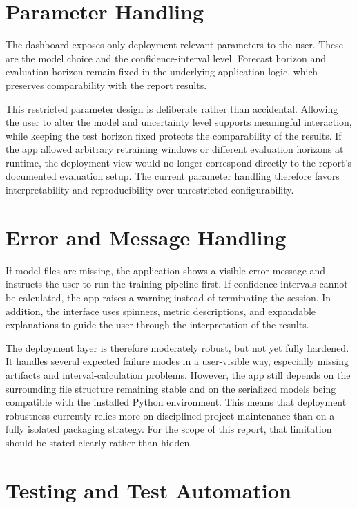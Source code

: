 \section{Parameter Handling}

The dashboard exposes only deployment-relevant parameters to the user. These are the model choice and the confidence-interval level. Forecast horizon and evaluation horizon remain fixed in the underlying application logic, which preserves comparability with the report results.

This restricted parameter design is deliberate rather than accidental. Allowing the user to alter the model and uncertainty level supports meaningful interaction, while keeping the test horizon fixed protects the comparability of the results. If the app allowed arbitrary retraining windows or different evaluation horizons at runtime, the deployment view would no longer correspond directly to the report's documented evaluation setup. The current parameter handling therefore favors interpretability and reproducibility over unrestricted configurability.

\section{Error and Message Handling}

If model files are missing, the application shows a visible error message and instructs the user to run the training pipeline first. If confidence intervals cannot be calculated, the app raises a warning instead of terminating the session. In addition, the interface uses spinners, metric descriptions, and expandable explanations to guide the user through the interpretation of the results.

The deployment layer is therefore moderately robust, but not yet fully hardened. It handles several expected failure modes in a user-visible way, especially missing artifacts and interval-calculation problems. However, the app still depends on the surrounding file structure remaining stable and on the serialized models being compatible with the installed Python environment. This means that deployment robustness currently relies more on disciplined project maintenance than on a fully isolated packaging strategy. For the scope of this report, that limitation should be stated clearly rather than hidden.

\section{Testing and Test Automation}

